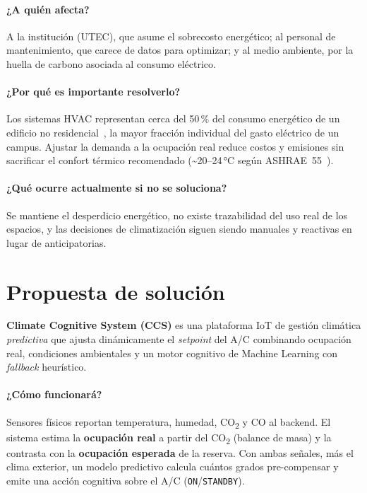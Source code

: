 \documentclass[11pt,a4paper]{article}
\begin{document}
\paragraph{¿A quién afecta?} A la institución (UTEC), que asume el sobrecosto
energético; al personal de mantenimiento, que carece de datos para optimizar; y
al medio ambiente, por la huella de carbono asociada al consumo eléctrico.

\paragraph{¿Por qué es importante resolverlo?} Los sistemas HVAC representan
cerca del 50\,\% del consumo energético de un edificio no
residencial~\cite{perezlombard2008}, la mayor fracción individual del gasto
eléctrico de un campus. Ajustar la demanda a la
ocupación real reduce costos y emisiones sin sacrificar el confort térmico
recomendado (\textasciitilde 20--24\,°C según ASHRAE~55~\cite{ashrae55}).

\paragraph{¿Qué ocurre actualmente si no se soluciona?} Se mantiene el
desperdicio energético, no existe trazabilidad del uso real de los espacios, y
las decisiones de climatización siguen siendo manuales y reactivas en lugar de
anticipatorias.

\section{Propuesta de solución}

\textbf{Climate Cognitive System (CCS)} es una plataforma IoT de gestión
climática \emph{predictiva} que ajusta dinámicamente el \emph{setpoint} del A/C
combinando ocupación real, condiciones ambientales y un motor cognitivo de
Machine Learning con \emph{fallback} heurístico.

\paragraph{¿Cómo funcionará?} Sensores físicos reportan temperatura, humedad,
CO\textsubscript{2} y CO al backend. El sistema estima la \textbf{ocupación real}
a partir del CO\textsubscript{2} (balance de masa) y la contrasta con la
\textbf{ocupación esperada} de la reserva. Con ambas señales, más el clima
exterior, un modelo predictivo calcula cuántos grados pre-compensar y emite una
acción cognitiva sobre el A/C (\texttt{ON}/\texttt{STANDBY}).
\end{document}
